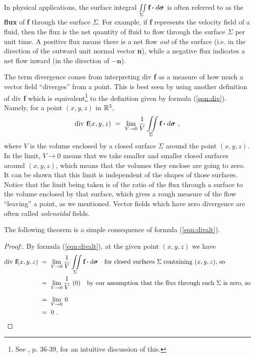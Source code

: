 In physical applications, the surface integral $\iint\limits_{\Sigma} \textbf{f} \bm{\cdot} d\bm{\sigma}$ is often
referred to as the \textbf{flux} of \textbf{f} through the surface $\Sigma$. For example, if \textbf{f}
represents the velocity field of a fluid, then the flux
is the net quantity of fluid to flow through the surface $\Sigma$ per unit time. A
positive flux means there is a net flow \emph{out} of the surface (i.e. in the direction of the outward
unit normal vector \textbf{n}), while a negative flux indicates a net flow inward (in the direction of
$-\textbf{n}$).

The term divergence comes from interpreting div \textbf{f} as a measure of how much a vector field ``diverges''
from a point. This is best seen by using another definition of div \textbf{f} which is
equivalent\footnote{See \cite{sch}, p. 36-39, for an intuitive discussion of this.} to the definition given by
formula (\ref{eqn:div}). Namely, for a point $(x,y,z)$ in $\mathbb{R}^{3}$,
\begin{equation}\label{eqn:divalt}
 \text{div}~\textbf{f}(x,y,z) ~=~ \lim_{V \to 0} \frac{1}{V} \iint\limits_{\Sigma} \textbf{f} \bm{\cdot} d\bm{\sigma} ~,
\end{equation}
where $V$ is the volume enclosed by a closed surface $\Sigma$ around the point $(x,y,z)$. In the limit, $V \to 0$ means
that we take smaller and smaller closed surfaces around $(x,y,z)$, which means that the volumes they enclose are going
to zero. It can be shown that this limit is independent of the shapes of those surfaces. Notice that the limit being
taken is of the ratio of the flux through a surface to the volume enclosed by that surface, which gives a rough
measure of the flow ``leaving'' a point, as we mentioned. Vector fields which have zero divergence are
often called \emph{solenoidal} fields.

The following theorem is a simple consequence of formula (\ref{eqn:divalt}).

\begin{proofbar}\vspace{-3mm}\begin{proof}[Proof:]
 By formula (\ref{eqn:divalt}), at the given point $(x,y,z)$ we have 
 \begin{align*}
  \text{div}~\textbf{f}(x,y,z) ~&=~ \lim_{V \to 0} \frac{1}{V} \iint\limits_{\Sigma} \Dotprod{\textbf{f}}{d\bm{\sigma}}
   ~~~\text{for closed surfaces $\Sigma$ containing $(x,y,z)$, so}\\
    &=~ \lim_{V \to 0} \frac{1}{V} \,\, (0) ~~~\text{by our assumption that the flux through each $\Sigma$ is
    zero, so}\\[6pt]
    &=~ \lim_{V \to 0} \, 0\\
    &=~ 0 ~.\hfill\qedhere
 \end{align*}
\end{proof}\vspace{-3mm}\end{proofbar}

